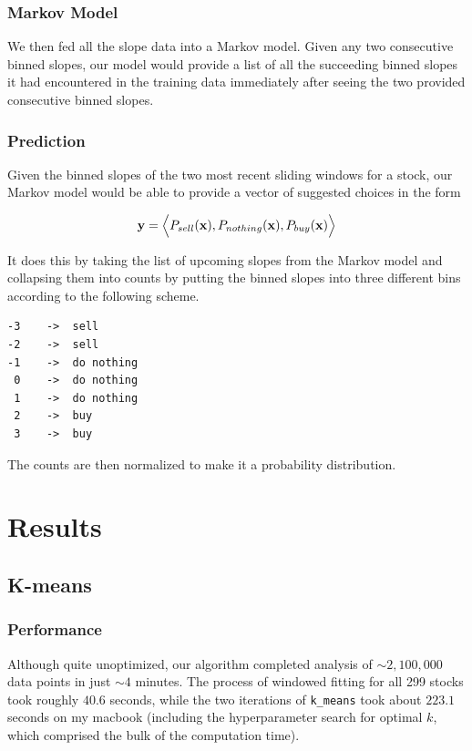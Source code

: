 \documentclass[final]{article}
\begin{document}
\subsubsection{Markov Model}

We then fed all the slope data into a Markov model. Given any two consecutive
binned slopes, our model would provide a list of all the succeeding binned
slopes it had encountered in the training data immediately after seeing the two
provided consecutive binned slopes.

\subsubsection{Prediction}

Given the binned slopes of the two most recent sliding windows for a stock, our
Markov model would be able to provide a vector of suggested choices in the form

\[
  \mathbf{y} = \Bigl<P_{sell}(\mathbf{x}), P_{nothing}(\mathbf{x}),
  P_{buy}(\mathbf{x})\Bigr>
\]

It does this by taking the list of upcoming slopes from the Markov model and
collapsing them into counts by putting the binned slopes into three different
bins according to the following scheme.

\begin{verbatim}
-3    ->  sell
-2    ->  sell
-1    ->  do nothing
 0    ->  do nothing
 1    ->  do nothing
 2    ->  buy
 3    ->  buy
\end{verbatim}

The counts are then normalized to make it a probability distribution.

\section{Results}

\subsection{K-means}

\subsubsection{Performance}

Although quite unoptimized, our algorithm completed analysis of $\sim
2,100,000$ data points in just $\sim 4$ minutes. The process of
windowed fitting for all 299 stocks took roughly $40.6$ seconds, while
the two iterations of \texttt{k\_means} took about $223.1$ seconds on
my macbook (including the hyperparameter search for optimal $k$, which
comprised the bulk of the computation time).
\end{document}
